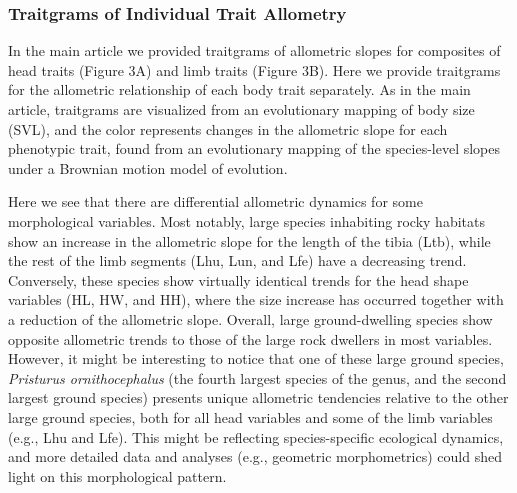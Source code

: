 \documentclass[
  11pt,
]{article}
\begin{document}
\hypertarget{traitgrams-of-individual-trait-allometry}{%
\subsubsection{Traitgrams of Individual Trait
Allometry}\label{traitgrams-of-individual-trait-allometry}}

In the main article we provided traitgrams of allometric slopes for
composites of head traits (Figure 3A) and limb traits (Figure 3B). Here
we provide traitgrams for the allometric relationship of each body trait
separately. As in the main article, traitgrams are visualized from an
evolutionary mapping of body size (SVL), and the color represents
changes in the allometric slope for each phenotypic trait, found from an
evolutionary mapping of the species-level slopes under a Brownian motion
model of evolution.

Here we see that there are differential allometric dynamics for some
morphological variables. Most notably, large species inhabiting rocky
habitats show an increase in the allometric slope for the length of the
tibia (Ltb), while the rest of the limb segments (Lhu, Lun, and Lfe)
have a decreasing trend. Conversely, these species show virtually
identical trends for the head shape variables (HL, HW, and HH), where
the size increase has occurred together with a reduction of the
allometric slope. Overall, large ground-dwelling species show opposite
allometric trends to those of the large rock dwellers in most variables.
However, it might be interesting to notice that one of these large
ground species, \emph{Pristurus ornithocephalus} (the fourth largest
species of the genus, and the second largest ground species) presents
unique allometric tendencies relative to the other large ground species,
both for all head variables and some of the limb variables (e.g., Lhu
and Lfe). This might be reflecting species-specific ecological dynamics,
and more detailed data and analyses (e.g., geometric morphometrics)
could shed light on this morphological pattern.
\end{document}
